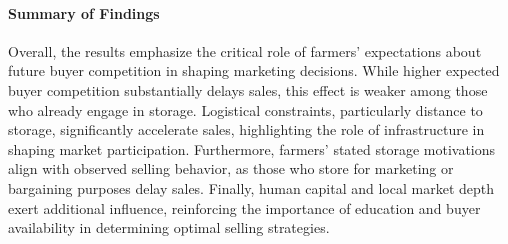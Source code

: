 \documentclass[12pt]{article}
\begin{document}
\paragraph{Summary of Findings}  
Overall, the results emphasize the critical role of farmers’ expectations about future buyer competition in shaping marketing decisions. While higher expected buyer competition substantially delays sales, this effect is weaker among those who already engage in storage. Logistical constraints, particularly distance to storage, significantly accelerate sales, highlighting the role of infrastructure in shaping market participation. Furthermore, farmers’ stated storage motivations align with observed selling behavior, as those who store for marketing or bargaining purposes delay sales. Finally, human capital and local market depth exert additional influence, reinforcing the importance of education and buyer availability in determining optimal selling strategies.


\newpage

\end{document}
